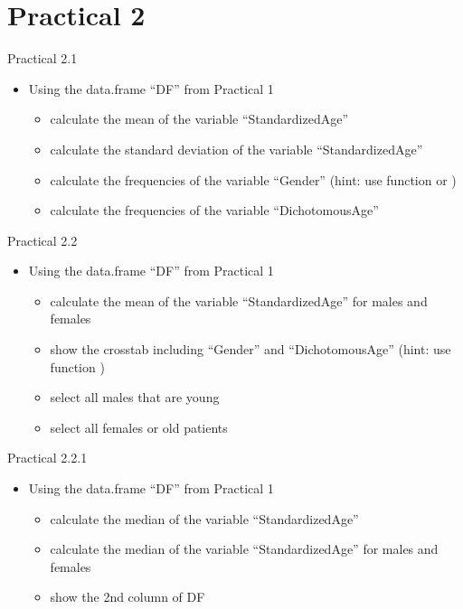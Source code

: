 \documentclass[14pt, aspectratio=169, sectionpage=simple, xclolor=table]{beamer}
\begin{document}
\section{Practical 2}
\begin{frame}{Practical 2.1}
\begin{itemize}
\item Using the data.frame \enquote{DF} from Practical 1
\begin{itemize}
\item calculate the mean of the variable \enquote{StandardizedAge}
\item calculate the standard deviation of the variable \enquote{StandardizedAge}
\item calculate the frequencies of the variable \enquote{Gender} (hint: use function   or )
\item calculate the frequencies of the variable \enquote{DichotomousAge}
\end{itemize}
\end{itemize}
\end{frame}
\begin{frame}{Practical 2.2}
\begin{itemize}
\item Using the data.frame \enquote{DF} from Practical 1
\begin{itemize}
\item calculate the mean of the variable \enquote{StandardizedAge} for males and females
\item show the crosstab including \enquote{Gender} and \enquote{DichotomousAge} (hint: use function )
\item select all males that are young
\item select all females or old patients
\end{itemize}
\end{itemize}
\end{frame}
\begin{frame}{Practical 2.2.1 }
\begin{itemize}
\item Using the data.frame \enquote{DF} from Practical 1
\begin{itemize}
\item calculate the median of the variable \enquote{StandardizedAge}
\item calculate the median of the variable \enquote{StandardizedAge} for males and females
\item show the 2nd column of DF
\end{itemize}
\end{itemize}
\end{frame}
\end{document}
